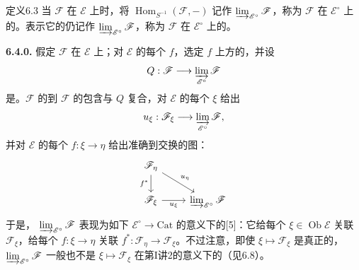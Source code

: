 \begin{SGAresult}{定义}{6.3}
当 $\mathscr F$ 在 $\mathscr E$ 上时，将 $\operatorname{Hom}_{S^{-1}}(\mathscr F,-)$ 记作 $\varinjlim_{\mathscr E^{\circ}}\mathscr F$，称为 $\mathscr F$ 在 $\mathscr E^{\circ}$ 上的。表示它的仍记作 $\varinjlim_{\mathscr E^{\circ}}\mathscr F$，称为 $\mathscr F$ 在 $\mathscr E^{\circ}$ 上的。
\end{SGAresult}

\textbf{6.4.0.} 假定 $\mathscr F$ 在 $\mathscr E$ 上；对 $\mathscr E$ 的每个 $f$，选定 $f$ 上方的，并设
\[
Q:\mathscr F\longrightarrow\varinjlim_{\mathscr E^{\circ}}\mathscr F
\]
是。$\mathscr F$ 的到 $\mathscr F$ 的包含与 $Q$ 复合，对 $\mathscr E$ 的每个 $\xi$ 给出
\[
u_\xi:\mathscr F_\xi\longrightarrow\varinjlim_{\mathscr E^{\circ}}\mathscr F,
\]
并对 $\mathscr E$ 的每个 $f:\xi\to\eta$ 给出准确到交换的图：
\[
\begin{tikzcd}
\mathscr F_\eta\arrow[d,"f^*"']\arrow[dr,"u_\eta"]&\\
\mathscr F_\xi\arrow[r,"u_\xi"']&\varinjlim_{\mathscr E^{\circ}}\mathscr F
\end{tikzcd}
\]
于是， $\varinjlim_{\mathscr E^{\circ}}\mathscr F$ 表现为如下 $\mathscr E^{\circ}\to\mathrm{Cat}$ 的意义下的[5]：它给每个 $\xi\in\operatorname{Ob}\mathscr E$ 关联 $\mathscr F_\xi$，给每个 $f:\xi\to\eta$ 关联 $f^*:\mathscr F_\eta\to\mathscr F_\xi$。不过注意，即使 $\xi\mapsto\mathscr F_\xi$ 是真正的， $\varinjlim_{\mathscr E^{\circ}}\mathscr F$ 一般也不是 $\xi\mapsto\mathscr F_\xi$ 在第I讲2的意义下的（见6.8）。

